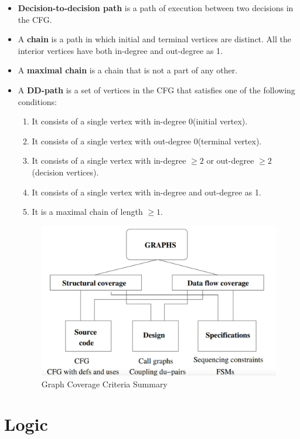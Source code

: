 \documentclass[a4paper]{article}
\begin{document}
\begin{itemize}
    \item \textbf{Decision-to-decision path} is a path of execution between two decisions in the CFG.
    \item A \textbf{chain} is a path in which initial and terminal vertices are distinct. All the interior vertices have both in-degree and out-degree as 1.
    \item A \textbf{maximal chain} is a chain that is not a part of any other.
    \item A \textbf{DD-path} is a set of vertices in the CFG that satisfies one of the following conditions:
    \begin{enumerate}
        \item It consists of a single vertex with in-degree 0(initial vertex).
        \item It consists of a single vertex with out-degree 0(terminal vertex).
        \item It consists of a single vertex with in-degree $\geq 2$ or out-degree $\geq 2$(decision vertices).
        \item It consists of a single vertex with in-degree and out-degree as 1.
        \item It is a maximal chain of length $\geq 1$.
    \end{enumerate}
    \begin{figure}[H]
        \centering
        \includegraphics[width=0.5\linewidth]{Degree//static/ST_Graph_summary.png}
        \caption{Graph Coverage Criteria Summary}
        \label{fig:ST-graph-coverage-summary}
    \end{figure}
\end{itemize}

\section{Logic}
\end{document}
